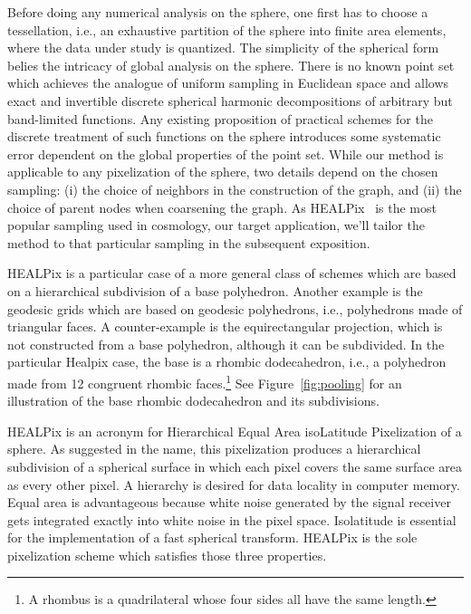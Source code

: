 \documentclass[final,twocolumn,3p,times,authoryear]{elsarticle}
\newcommand{\figref}[1]{Figure~\ref{fig:#1}}
\newcommand{\1}{\b{1}}              %
\newcommand{\0}{\b{0}}              %
\begin{document}
Before doing any numerical analysis on the sphere, one first has to choose a tessellation, i.e., an exhaustive partition of the sphere into finite area elements, where the data under study is quantized.
The simplicity of the spherical form belies the intricacy of global analysis on the sphere. There is no known point set which achieves the analogue of uniform sampling in Euclidean space and allows exact and invertible discrete spherical harmonic decompositions of arbitrary but band-limited functions. Any existing proposition of practical schemes for the discrete treatment of such functions on the sphere introduces some systematic error dependent on the global properties of the point set.
While our method is applicable to any pixelization of the sphere, two details depend on the chosen sampling: (i) the choice of neighbors in the construction of the graph, and (ii) the choice of parent nodes when coarsening the graph.
As HEALPix~\citep{gorski2005healpix} is the most popular sampling used in cosmology, our target application, we'll tailor the method to that particular sampling in the subsequent exposition.

HEALPix is a particular case of a more general class of schemes which are based on a hierarchical subdivision of a base polyhedron.
Another example is the geodesic grids which are based on geodesic polyhedrons, i.e., polyhedrons made of triangular faces. A counter-example is the equirectangular projection, which is not constructed from a base polyhedron, although it can be subdivided.
In the particular Healpix case, the base is a rhombic dodecahedron, i.e., a polyhedron made from 12 congruent rhombic faces.\footnote{A rhombus is a quadrilateral whose four sides all have the same length.} See \figref{pooling} for an illustration of the base rhombic dodecahedron and its subdivisions.

HEALPix is an acronym for Hierarchical Equal Area isoLatitude Pixelization of a sphere. As suggested in the name, this pixelization produces a hierarchical subdivision of a spherical surface in which each pixel covers the same surface area as every other pixel.
A hierarchy is desired for data locality in computer memory. Equal area is advantageous because white noise generated by the signal receiver gets integrated exactly into white noise in the pixel space. Isolatitude is essential for the implementation of a fast spherical transform. HEALPix is the sole pixelization scheme which satisfies those three properties.
\end{document}
